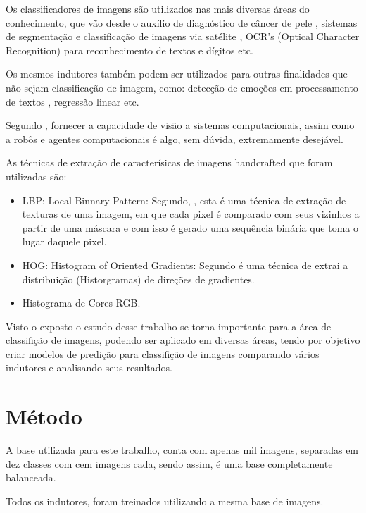 \documentclass[
article,			%
11pt,				%
oneside,			%
a4paper,			%
english,			%
brazil,				%
sumario=tradicional,
]{abntex2}
\begin{document}
	Os classificadores de imagens são utilizados nas mais diversas áreas do conhecimento,  que vão desde o auxílio de diagnóstico de câncer de pele  , sistemas de segmentação e classificação de imagens via satélite , OCR's (Optical Character Recognition) para reconhecimento de textos e dígitos  etc.
	
	Os mesmos indutores também podem ser utilizados para outras finalidades que não sejam classificação de imagem, como: detecção de emoções em processamento de textos , regressão linear etc.
	
	Segundo , fornecer a capacidade de visão a sistemas computacionais, assim como a robôs e agentes computacionais é algo, sem dúvida, extremamente desejável.
	
	As técnicas de extração de caracterísicas de imagens handcrafted que foram utilizadas são: 
	
	\begin{itemize}
		\item LBP: Local Binnary Pattern: Segundo, , esta é uma técnica de extração de texturas de uma imagem, em que cada pixel é comparado com seus vizinhos a partir de uma máscara e com isso é gerado uma sequência binária que toma o lugar daquele pixel. 
		\item HOG: Histogram of Oriented Gradients: Segundo  é uma técnica de extrai a distribuição (Historgramas) de direções de gradientes.
		\item Histograma de Cores RGB.
	\end{itemize}
	
	Visto o exposto o estudo desse trabalho se torna importante para a área de classifição de imagens, podendo ser aplicado em diversas áreas, tendo por objetivo criar modelos de predição para classifição de imagens comparando vários indutores e analisando seus resultados.
	
	
	\section{Método}
	
	
	A base utilizada para este trabalho, conta com apenas mil imagens, separadas em dez classes com cem imagens cada, sendo assim, é uma base completamente balanceada.
	
	Todos os indutores, foram treinados utilizando a mesma base de imagens.
	
\end{document}
